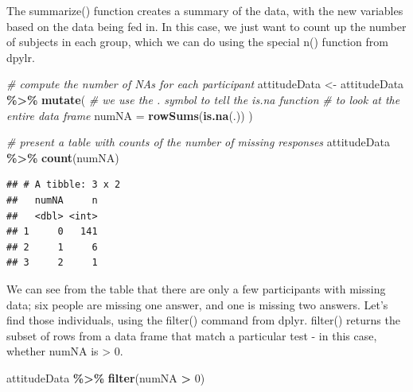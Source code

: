 \documentclass[
  12pt,
]{book}
\newenvironment{Shaded}{\begin{snugshade}}{\end{snugshade}}
\newcommand{\AttributeTok}[1]{\textcolor[rgb]{0.13,0.29,0.53}{#1}}
\newcommand{\CommentTok}[1]{\textcolor[rgb]{0.56,0.35,0.01}{\textit{#1}}}
\newcommand{\DecValTok}[1]{\textcolor[rgb]{0.00,0.00,0.81}{#1}}
\newcommand{\FunctionTok}[1]{\textcolor[rgb]{0.13,0.29,0.53}{\textbf{#1}}}
\newcommand{\NormalTok}[1]{#1}
\newcommand{\OtherTok}[1]{\textcolor[rgb]{0.56,0.35,0.01}{#1}}
\newcommand{\SpecialCharTok}[1]{\textcolor[rgb]{0.81,0.36,0.00}{\textbf{#1}}}
\begin{document}
The summarize() function creates a summary of the data, with the new variables based on the data being fed in. In this case, we just want to count up the number of subjects in each group, which we can do using the special n() function from dpylr.

\begin{Shaded}
\begin{Highlighting}[]
\CommentTok{\# compute the number of NAs for each participant}
\NormalTok{attitudeData }\OtherTok{\textless{}{-}} 
\NormalTok{  attitudeData }\SpecialCharTok{\%\textgreater{}\%} 
  \FunctionTok{mutate}\NormalTok{(}
    \CommentTok{\# we use the . symbol to tell the is.na function }
    \CommentTok{\# to look at the entire data frame}
    \AttributeTok{numNA =} \FunctionTok{rowSums}\NormalTok{(}\FunctionTok{is.na}\NormalTok{(.)) }
\NormalTok{  )}
  
\CommentTok{\# present a table with counts of the number of missing responses}
\NormalTok{attitudeData }\SpecialCharTok{\%\textgreater{}\%} 
  \FunctionTok{count}\NormalTok{(numNA)}
\end{Highlighting}
\end{Shaded}

\begin{verbatim}
## # A tibble: 3 x 2
##   numNA     n
##   <dbl> <int>
## 1     0   141
## 2     1     6
## 3     2     1
\end{verbatim}

We can see from the table that there are only a few participants with missing data; six people are missing one answer, and one is missing two answers. Let's find those individuals, using the filter() command from dplyr. filter() returns the subset of rows from a data frame that match a particular test - in this case, whether numNA is \textgreater{} 0.

\begin{Shaded}
\begin{Highlighting}[]
\NormalTok{attitudeData }\SpecialCharTok{\%\textgreater{}\%} 
  \FunctionTok{filter}\NormalTok{(numNA }\SpecialCharTok{\textgreater{}} \DecValTok{0}\NormalTok{)}
\end{Highlighting}
\end{Shaded}
\end{document}
